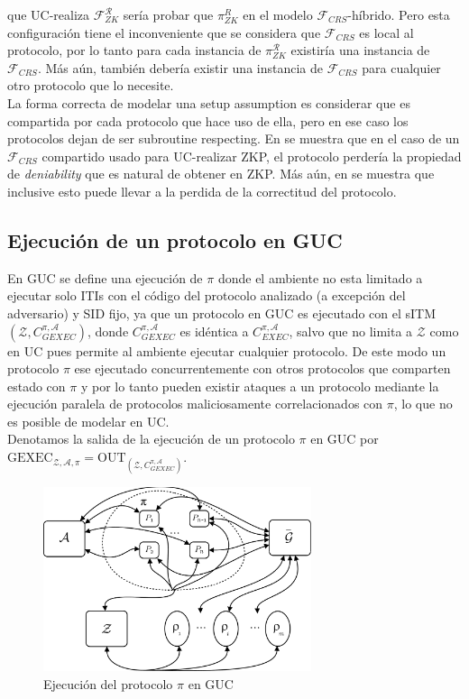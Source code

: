 que UC-realiza $\mathcal{F}_{ZK}^\mathcal{R}$ sería probar que $\pi_{ZK}^{R}$ en el modelo
$\mathcal{F}_{CRS}$-híbrido. Pero esta configuración tiene el inconveniente que se considera que
$\mathcal{F}_{CRS}$ es local al protocolo, por lo tanto para cada instancia de $\pi_{ZK}^\mathcal{R}$
existiría una instancia de $\mathcal{F}_{CRS}$. Más aún, también debería existir una instancia de
$\mathcal{F}_{CRS}$ para cualquier otro protocolo que lo necesite.\\
La forma correcta de modelar una setup assumption es considerar que es compartida por cada protocolo
que hace uso de ella, pero en ese caso los protocolos dejan de ser subroutine respecting.
En \cite{Pass03} se muestra que en el caso de un $\mathcal{F}_{CRS}$ compartido
usado para UC-realizar ZKP, el protocolo perdería la propiedad de \textit{deniability} que es natural
de obtener en ZKP. Más aún, en \cite{journals/tcs/YaoYZ09} se muestra que inclusive esto puede llevar
a la perdida de la correctitud del protocolo.\\

\subsection{Ejecución de un protocolo en GUC}

En GUC se define una ejecución de $\pi$ donde el ambiente no esta limitado a ejecutar solo ITIs con el código del
protocolo analizado (a excepción del adversario) y SID fijo, ya que un protocolo en GUC es ejecutado con el
sITM $(\mathcal{Z}, C_{GEXEC}^{\pi, \mathcal{A}})$, donde $C_{GEXEC}^{\pi, \mathcal{A}}$ es idéntica a
$C_{EXEC}^{\pi, \mathcal{A}}$, salvo que no limita a $\mathcal{Z}$ como en UC pues permite al ambiente ejecutar
cualquier protocolo. De este modo un protocolo $\pi$
ese ejecutado concurrentemente con otros protocolos que comparten estado con $\pi$ y por lo tanto pueden existir
ataques a un protocolo mediante la ejecución paralela de protocolos
maliciosamente correlacionados con $\pi$, lo que no es posible de modelar en UC.\\ 
Denotamos la salida de la ejecución de un protocolo $\pi$ en GUC por
$\mathrm{GEXEC}_{
    \mathcal{Z},
    \mathcal{A},
    \pi}
=
\mathrm{OUT}_{(\mathcal{Z},
              C_{GEXEC}^{\pi, \mathcal{A}})}$.\\

\begin{figure}[hp]
    \centering
    \includegraphics[width=0.7\textwidth]{figs/mundo_real_guc}
    \caption{Ejecución del protocolo $\pi$ en GUC}
    \label{fig:mundo_real_guc}
\end{figure}

